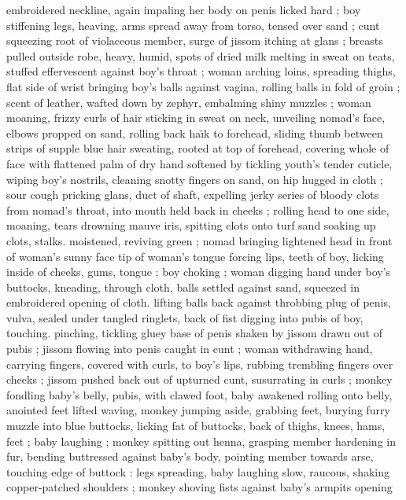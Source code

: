 embroidered neckline, again impaling her body on penis licked hard 
; boy stiffening legs, heaving, arms spread away from torso, tensed 
over sand ; cunt squeezing root of violaceous member, surge of 
jissom itching at glans ; breasts pulled outside robe, heavy, humid, 
spots of dried milk melting in sweat on teats, stuffed effervescent 
against boy's throat ; woman arching loins, spreading thighs, flat 
side of wrist bringing boy's balls against vagina, rolling balls in fold 
of groin ; scent of leather, wafted down by zephyr, embalming shiny 
muzzles ; woman moaning, frizzy curls of hair sticking in sweat on 
neck, unveiling nomad's face, elbows propped on sand, rolling back 
ha\"{\i}k to forehead, sliding thumb between strips of supple blue hair 
sweating, rooted at top of forehead, covering whole of face with 
flattened palm of dry hand softened by tickling youth's tender 
cuticle, wiping boy's nostrils, cleaning snotty fingers on sand, on hip 
hugged in cloth ; sour cough pricking glans, duct of shaft, expelling 
jerky series of bloody clots from nomad's throat, into mouth {\col} held 
back in cheeks ; rolling head to one side, moaning, tears drowning 
mauve iris, spitting clots onto turf {\col} sand soaking up clots, stalks. 
moistened, reviving green ; nomad bringing lightened head in front 
of woman's sunny face {\col} tip of woman's tongue forcing lips, teeth of 
boy, licking inside of cheeks, gums, tongue ; boy choking ; woman 
digging hand under boy's buttocks, kneading, through cloth, balls 
settled against sand, squeezed in embroidered opening of cloth. 
lifting balls back against throbbing plug of penis, vulva, sealed under 
tangled ringlets, back of fist digging into pubis of boy, touching. 
pinching, tickling gluey base of penis shaken by jissom drawn out of 
pubis ; jissom flowing into penis caught in cunt ; woman withdrawing 
hand, carrying fingers, covered with curls, to boy's lips, rubbing 
trembling fingers over cheeks ; jissom pushed back out of upturned 
cunt, susurrating in curls ; monkey fondling baby's belly, pubis, with 
clawed foot, baby awakened rolling onto belly, anointed feet lifted 
waving, monkey jumping aside, grabbing feet, burying furry muzzle 
into blue buttocks, licking fat of buttocks, back of thighs, knees, 
hams, feet ; baby laughing ; monkey spitting out henna, grasping 
member hardening in fur, bending buttressed against baby's body, 
pointing member towards arse, touching edge of buttock : legs 
spreading, baby laughing slow, raucous, shaking copper-patched 
shoulders ; monkey shoving fists against baby's armpits opening 
